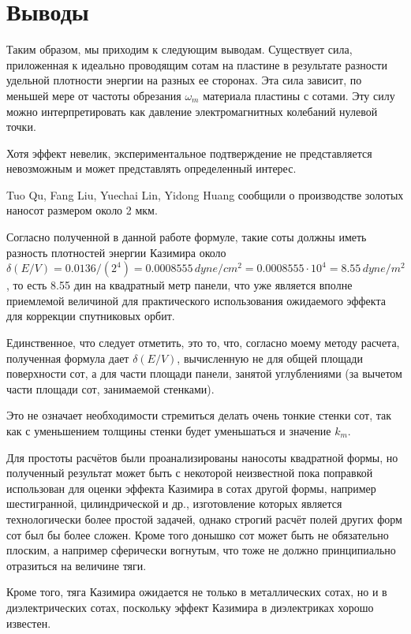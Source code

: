 \documentclass[11pt]{article}
\begin{document}
    \section{Выводы}\label{ux432ux44bux432ux43eux434ux44b}

    Таким образом, мы приходим к следующим выводам. Существует сила,
приложенная к идеально проводящим сотам на пластине в результате
разности удельной плотности энергии на разных ее сторонах. Эта сила
зависит, по меньшей мере от частоты обрезания \(\omega_m\) материала
пластины с сотами. Эту силу можно интерпретировать как давление
электромагнитных колебаний нулевой точки.

    Хотя эффект невелик, экспериментальное подтверждение не представляется
невозможным и может представлять определенный интерес.

    Tuo Qu, Fang Liu, Yuechai Lin, Yidong Huang \cite{Tuo2019} сообщили о
производстве золотых наносот размером около 2 мкм.

    Согласно полученной в данной работе формуле, такие соты должны иметь
разность плотностей энергии Казимира около
\(\delta\left(E/V\right) = 0.0136/({2^4}) = 0.0008555\,dyne/cm^2 = 0.0008555 \cdot 10^4 = 8.55\,dyne/m^2\),
то есть 8.55 дин на квадратный метр панели, что уже является вполне
приемлемой величиной для практического использования ожидаемого эффекта
для коррекции спутниковых орбит.

    Единственное, что следует отметить, это то, что, согласно моему методу
расчета, полученная формула дает \(\delta\left(E/V\right)\), вычисленную
не для общей площади поверхности сот, а для части площади панели,
занятой углублениями (за вычетом части площади сот, занимаемой
стенками).

    Это не означает необходимости стремиться делать очень тонкие стенки сот,
так как с уменьшением толщины стенки будет уменьшаться и значение
\(k_m\).

    Для простоты расчётов были проанализированы наносоты квадратной формы,
но полученный результат может быть с некоторой неизвестной пока поправкой
использован для оценки эффекта Казимира в сотах другой формы, например
шестигранной, цилиндрической и др., изготовление которых является технологически
более простой задачей, однако строгий расчёт полей других форм сот был бы более
сложен. Кроме того донышко сот может быть не обязательно плоским, а например
сферически вогнутым, что тоже не должно принципиально отразиться на величине тяги.

    Кроме того, тяга Казимира ожидается не только в металлических сотах,
но и в диэлектрических сотах, поскольку эффект Казимира в диэлектриках хорошо известен.
\end{document}
